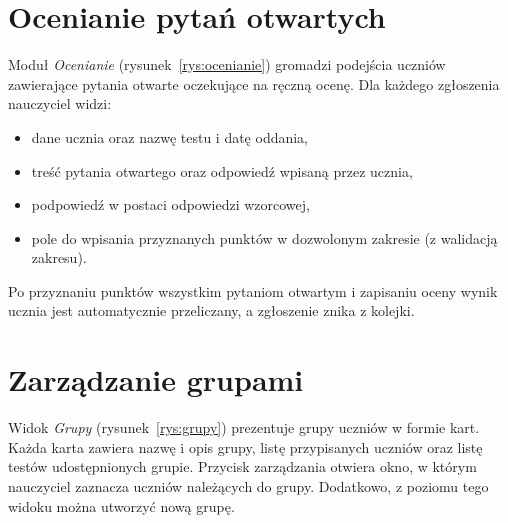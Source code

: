 

\section{Ocenianie pytań otwartych}
\label{sec:ocenianie}

Moduł \emph{Ocenianie} (rysunek~\ref{rys:ocenianie}) gromadzi podejścia uczniów zawierające pytania
otwarte oczekujące na ręczną ocenę. Dla każdego zgłoszenia nauczyciel widzi:

\begin{itemize}
  \item dane ucznia oraz nazwę testu i datę oddania,
  \item treść pytania otwartego oraz odpowiedź wpisaną przez ucznia,
  \item podpowiedź w postaci odpowiedzi wzorcowej,
  \item pole do wpisania przyznanych punktów w dozwolonym zakresie (z walidacją zakresu).
\end{itemize}

Po przyznaniu punktów wszystkim pytaniom otwartym i zapisaniu oceny wynik ucznia jest automatycznie
przeliczany, a zgłoszenie znika z kolejki.


\section{Zarządzanie grupami}
\label{sec:grupy}

Widok \emph{Grupy} (rysunek~\ref{rys:grupy}) prezentuje grupy uczniów w formie kart. Każda karta
zawiera nazwę i opis grupy, listę przypisanych uczniów oraz listę testów udostępnionych grupie.
Przycisk zarządzania otwiera okno, w którym nauczyciel zaznacza uczniów należących do grupy.
Dodatkowo, z poziomu tego widoku można utworzyć nową grupę.


